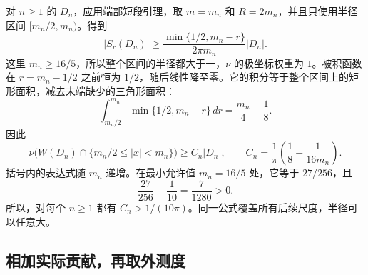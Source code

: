 对 $n\geq1$ 的 $D_n$，应用端部短段引理，取 $m=m_n$ 和 $R=2m_n$，并且只使用半径区间 $[m_n/2,m_n)$。得到
\[
 |S_r(D_n)|\geq\frac{\min\{1/2,m_n-r\}}{2\pi m_n}|D_n|.
\]
这里 $m_n\geq16/5$，所以整个区间的半径都大于一，$\nu$ 的极坐标权重为 $1$。被积函数在 $r=m_n-1/2$ 之前恒为 $1/2$，随后线性降至零。它的积分等于整个区间上的矩形面积，减去末端缺少的三角形面积：
\[
 \int_{m_n/2}^{m_n}\min\{1/2,m_n-r\}\,dr
                                   =\frac{m_n}{4}-\frac18.
\]
因此
\begin{equation}
 \nu\bigl(W(D_n)\cap\{m_n/2\leq|x|<m_n\}\bigr)
 \geq C_n|D_n|,\qquad
 C_n=\frac1\pi\left(\frac18-\frac1{16m_n}\right).
\label{eq:core-later-tails}
\end{equation}
括号内的表达式随 $m_n$ 递增。在最小允许值 $m_n=16/5$ 处，它等于 $27/256$，且
\[
                      \frac{27}{256}-\frac1{10}=\frac7{1280}>0.
\]
所以，对每个 $n\geq1$ 都有 $C_n>1/(10\pi)$。同一公式覆盖所有后续尺度，半径可以任意大。

\subsection{相加实际贡献，再取外测度}
\label{subsec:core-closure}

